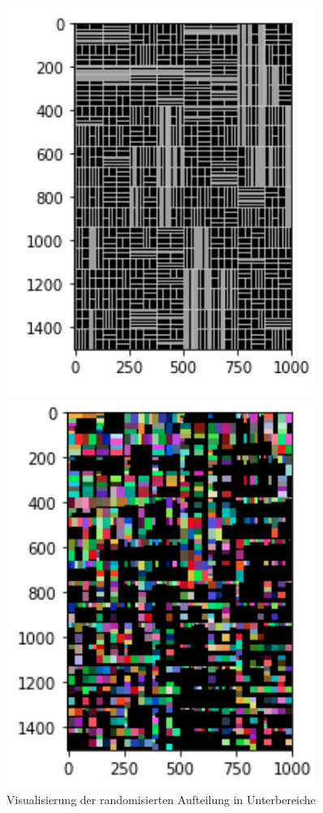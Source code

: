 \documentclass[12pt, ngerman, utf8]{article}
\begin{document}
\begin{figure}[h]
\centering
\begin{minipage}{.45\textwidth}
  \centering
  \includegraphics[width=0.9\textwidth]{./imgs/picwall-tree.png}
  \caption{Visualisierung der randomisierten Aufteilung in Unterbereiche}
  \label{fig:picwall-tree}
\end{minipage}%
\hfill
\begin{minipage}{.45\textwidth}
  \centering
  \includegraphics[width=0.9\textwidth]{./imgs/picwall-vis.png}

\end{minipage}
\end{figure}
\end{document}
